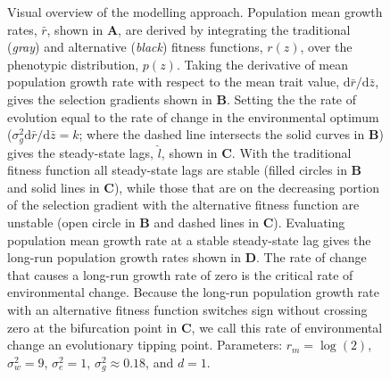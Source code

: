 \documentclass[12pt,letterpaper]{article} %
\begin{document}
%
%
%
%
\begin{figure}[!ht]
\centering
\caption{
Visual overview of the modelling approach. 
Population mean growth rates, $\bar{r}$, shown in \textbf{A}, are derived by integrating the traditional (\textit{gray}) and alternative (\textit{black}) fitness functions, $r(z)$, over the phenotypic distribution, $p(z)$.
Taking the derivative of mean population growth rate with respect to the mean trait value, $\mathrm{d}\bar{r}/\mathrm{d}\bar{z}$, gives the selection gradients shown in \textbf{B}.
Setting the the rate of evolution equal to the rate of change in the environmental optimum ($\sigma_g^2\mathrm{d}\bar{r}/\mathrm{d}\bar{z} = k$; where the dashed line intersects the solid curves in \textbf{B}) gives the steady-state lags, $\hat{l}$, shown in \textbf{C}.
With the traditional fitness function all steady-state lags are stable (filled circles in \textbf{B} and solid lines in \textbf{C}), while those that are on the decreasing portion of the selection gradient with the alternative fitness function are unstable (open circle in \textbf{B} and dashed lines in \textbf{C}). 
Evaluating population mean growth rate at a stable steady-state lag gives the long-run population growth rates shown in \textbf{D}.
The rate of change that causes a long-run growth rate of zero is the critical rate of environmental change.
Because the long-run population growth rate with an alternative fitness function switches sign without crossing zero at the bifurcation point in \textbf{C}, we call this rate of environmental change an evolutionary tipping point.  
Parameters: $r_m = \log(2)$, $\sigma_w^2 = 9$, $\sigma_e^2 = 1$, $\sigma_g^2\approx0.18$, and $d=1$.
}
\label{SSGrowth}
\end{figure}
\end{document}
